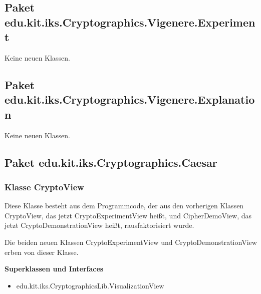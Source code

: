 \documentclass{article}
\begin{document}
  \subsection{Paket edu.kit.iks.Cryptographics.Vigenere.Experiment}
	Keine neuen Klassen.
  \subsection{Paket edu.kit.iks.Cryptographics.Vigenere.Explanation}
	Keine neuen Klassen.
  \subsection{Paket edu.kit.iks.Cryptographics.Caesar}
   \subsubsection{Klasse CryptoView}
          Diese Klasse besteht aus dem Programmcode, der aus den vorherigen Klassen CryptoView, das jetzt CryptoExperimentView heißt,
          und CipherDemoView, das jetzt CryptoDemonstrationView heißt, rausfaktorisiert wurde.
          
          Die beiden neuen Klassen CryptoExperimentView und CryptoDemonstrationView erben von dieser Klasse.\newline
           
    \textbf{Superklassen und Interfaces}
      \begin{itemize}
        \item  edu.kit.iks.CryptographicsLib.VisualizationView
      \end{itemize}
           
\end{document}
